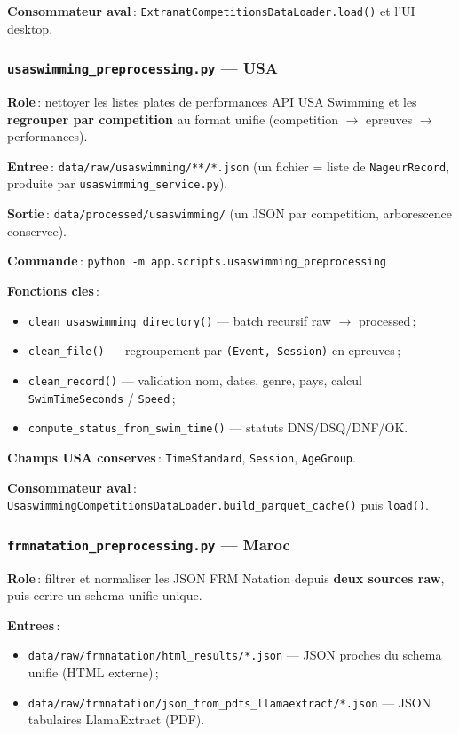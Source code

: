 \documentclass[11pt,a4paper]{article}
\begin{document}
\textbf{Consommateur aval}\,: \texttt{ExtranatCompetitionsDataLoader.load()} et l'UI desktop.

\subsubsection{\texttt{usaswimming\_preprocessing.py} --- USA}

\textbf{Role}\,: nettoyer les listes plates de performances API USA Swimming et les \textbf{regrouper par competition} au format unifie (competition $\rightarrow$ epreuves $\rightarrow$ performances).

\textbf{Entree}\,: \texttt{data/raw/usaswimming/**/*.json} (un fichier = liste de \texttt{NageurRecord}, produite par \texttt{usaswimming\_service.py}).

\textbf{Sortie}\,: \texttt{data/processed/usaswimming/} (un JSON par competition, arborescence conservee).

\textbf{Commande}\,: \texttt{python -m app.scripts.usaswimming\_preprocessing}

\textbf{Fonctions cles}\,:
\begin{itemize}
  \item \texttt{clean\_usaswimming\_directory()} --- batch recursif raw $\rightarrow$ processed\,;
  \item \texttt{clean\_file()} --- regroupement par \texttt{(Event, Session)} en epreuves\,;
  \item \texttt{clean\_record()} --- validation nom, dates, genre, pays, calcul \texttt{SwimTimeSeconds} / \texttt{Speed}\,;
  \item \texttt{compute\_status\_from\_swim\_time()} --- statuts DNS/DSQ/DNF/OK.
\end{itemize}

\textbf{Champs USA conserves}\,: \texttt{TimeStandard}, \texttt{Session}, \texttt{AgeGroup}.

\textbf{Consommateur aval}\,: \texttt{UsaswimmingCompetitionsDataLoader.build\_parquet\_cache()} puis \texttt{load()}.

\subsubsection{\texttt{frmnatation\_preprocessing.py} --- Maroc}

\textbf{Role}\,: filtrer et normaliser les JSON FRM Natation depuis \textbf{deux sources raw}, puis ecrire un schema unifie unique.

\textbf{Entrees}\,:
\begin{itemize}
  \item \texttt{data/raw/frmnatation/html\_results/*.json} --- JSON proches du schema unifie (HTML externe)\,;
  \item \texttt{data/raw/frmnatation/json\_from\_pdfs\_llamaextract/*.json} --- JSON tabulaires LlamaExtract (PDF).
\end{itemize}
\end{document}
